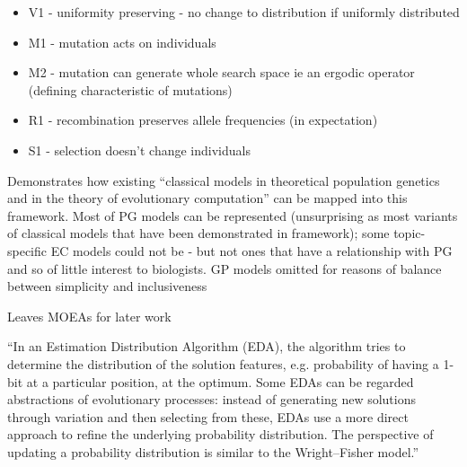 	\begin{itemize}
		\item
		
		V1 - uniformity preserving - no change to distribution if uniformly
		distributed
		
		\item
		
		M1 - mutation acts on individuals
		
		\item
		
		M2 - mutation can generate whole search space ie an ergodic operator
		(defining characteristic of mutations)
		
		\item
		
		R1 - recombination preserves allele frequencies (in expectation)
		
		\item
		
		S1 - selection doesn't change individuals
		
	\end{itemize}

	Demonstrates how existing ``classical models in theoretical population
	genetics and in the theory of evolutionary computation'' can be mapped
	into this framework. Most of PG models can be represented
	(unsurprising as most variants of classical models that have been
	demonstrated in framework); some topic-specific EC models could not be
	- but not ones that have a relationship with PG and so of little
	interest to biologists. GP models omitted for reasons of balance
	between simplicity and inclusiveness
	
	Leaves MOEAs for later work

	``In an Estimation Distribution Algorithm (EDA), the algorithm tries
	to determine the distribution of the solution features, e.g.
	probability of having a 1-bit at a particular position, at the
	optimum. Some EDAs can be regarded abstractions of evolutionary
	processes: instead of generating new solutions through variation and
	then selecting from these, EDAs use a more direct approach to refine
	the underlying probability distribution. The perspective of updating a
	probability distribution is similar to the Wright--Fisher model.''
		
